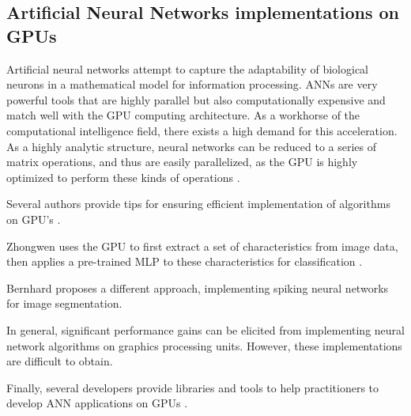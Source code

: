 \documentclass[prodmode,acmtecs]{acmsmall}
\begin{document}
\subsection{Artificial Neural Networks implementations on GPUs}

Artificial neural networks attempt to capture the adaptability of biological neurons in a mathematical model for information processing. ANNs are very powerful tools that are highly parallel but also computationally expensive and match well with the GPU computing architecture.  As a workhorse of the computational intelligence field, there exists a high demand for  this acceleration.  As a highly analytic structure, neural networks can be reduced to a series of matrix operations, and thus are easily parallelized, as the GPU is highly optimized to perform these kinds of operations \cite{Meuth2006}.  

Several authors provide tips for ensuring efficient implementation  of algorithms on GPU’s \cite{Oh2004,Luo2005,Martinez2007,Martinez2010}.

Zhongwen uses the GPU to first extract a set of characteristics from image data, then applies a pre-trained MLP to these characteristics for classification \cite{Luo2005}.

Bernhard \cite{BernhardCITA17} proposes a different approach, implementing spiking neural networks for image segmentation.

In general, significant performance gains can be elicited from implementing neural network algorithms on graphics processing units. However, these implementations are difficult to obtain.

Finally, several developers provide libraries and tools to help practitioners to develop ANN applications on GPUs \cite{url2}.

\end{document}
